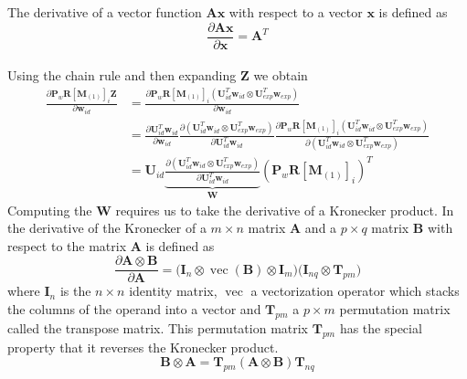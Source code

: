 \documentclass[11pt,a4paper,twoside]{report}
\begin{document}
The derivative of a vector function $\mathbf{A}\mathbf{x}$ with respect to a
vector $\mathbf{x}$ is defined as
\begin{equation*}
\frac{\partial \mathbf{A}\mathbf{x}}{\partial \mathbf{x}} = \mathbf{A}^T
\end{equation*}\\
Using the chain rule and then expanding $\mathbf{Z}$ we obtain
\begin{align}
\frac
{\partial 
\mathbf{P}_w\mathbf{R}[\mathbf{M}_{(1)}]_{i}\mathbf{Z}
}
{\partial
\mathbf{w}_{id}
}
&= 
\frac
{\partial
\mathbf{P}_w\mathbf{R}[\mathbf{M}_{(1)}]_{i}(\mathbf{U}_{id}^T\mathbf{w}_{id}
\otimes \mathbf{U}_{exp}^T\mathbf{w}_{exp})
}
{
\partial
\mathbf{w}_{id}
}\nonumber\\
&=
\frac
{\partial
\mathbf{U}_{id}^T\mathbf{w}_{id}
}
{\partial
\mathbf{w}_{id}
}
\frac
{\partial
(\mathbf{U}_{id}^T\mathbf{w}_{id} \otimes \mathbf{U}_{exp}^T\mathbf{w}_{exp})
}
{\partial
\mathbf{U}_{id}^T\mathbf{w}_{id}
}
\frac
{\partial
\mathbf{P}_w\mathbf{R}[\mathbf{M}_{(1)}]_{i}(\mathbf{U}_{id}^T\mathbf{w}_{id} \otimes \mathbf{U}_{exp}^T\mathbf{w}_{exp})
}
{\partial
(\mathbf{U}_{id}^T\mathbf{w}_{id} \otimes \mathbf{U}_{exp}^T\mathbf{w}_{exp})
}\nonumber\\\label{eq:opt0}
&=\mathbf{U}_{id}
\underbrace{
\frac
{\partial
(\mathbf{U}_{id}^T\mathbf{w}_{id} \otimes \mathbf{U}_{exp}^T\mathbf{w}_{exp})
}
{\partial
\mathbf{U}_{id}^T\mathbf{w}_{id}
}
}_{\mathbf{W}}
(\mathbf{P}_w\mathbf{R}[\mathbf{M}_{(1)}]_{i})^T
\end{align}
Computing the $\mathbf{W}$ requires us to take the derivative of a Kronecker
product. In \cite{matcalc} the derivative of the Kronecker of a $m \times n$
matrix $\mathbf{A}$ and a $p \times q$
matrix $\mathbf{B}$ with respect to the
matrix $\mathbf{A}$ is defined as  
\begin{equation}
\frac{\partial \mathbf{A} \otimes \mathbf{B}}{\partial \mathbf{A}} = 
\bigr(\mathbf{I}_{n} \otimes \mathop{vec}(\mathbf{B}) \otimes
\mathbf{I}_{m}\bigl)\bigr(\mathbf{I}_{nq} \otimes \mathbf{T}_{pm}\bigl)
\end{equation}
where $\mathbf{I}_{n}$ is the $n \times n$ identity matrix, $\mathop{vec}$ a
vectorization operator which stacks the columns of the operand into a vector and $\mathbf{T}_{pm}$
a $p \times m$ permutation matrix called the transpose matrix. This permutation matrix $\mathbf{T}_{pm}$ has
the special property that it reverses the Kronecker product.
\begin{equation}
\mathbf{B} \otimes \mathbf{A} = \mathbf{T}_{pm}(\mathbf{A} \otimes
\mathbf{B})\mathbf{T}_{nq}
\end{equation}\\
\end{document}
